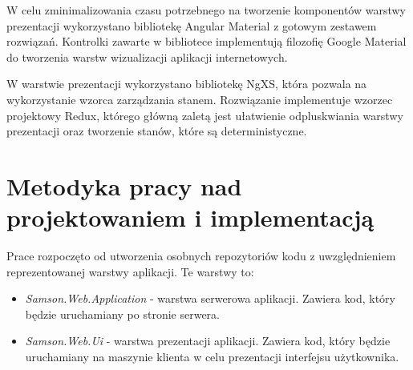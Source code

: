 \documentclass[a4paper,twoside,12pt]{book}
\begin{document}
	W celu zminimalizowania czasu potrzebnego na tworzenie komponentów warstwy prezentacji wykorzystano bibliotekę Angular Material z gotowym zestawem rozwiązań. Kontrolki zawarte w bibliotece implementują filozofię Google Material do tworzenia warstw wizualizacji aplikacji internetowych.
	
	W warstwie prezentacji wykorzystano bibliotekę NgXS, która pozwala na wykorzystanie wzorca zarządzania stanem. Rozwiązanie implementuje wzorzec projektowy Redux, którego główną zaletą jest ułatwienie odpluskwiania warstwy prezentacji oraz tworzenie stanów, które są deterministyczne.
	
	\section {Metodyka pracy nad projektowaniem i implementacją}
	
	Prace rozpoczęto od utworzenia osobnych repozytoriów kodu z uwzględnieniem reprezentowanej warstwy aplikacji. Te warstwy to:
	\begin{itemize}
		\item \textit{Samson.Web.Application} - warstwa serwerowa aplikacji. Zawiera kod, który będzie uruchamiany po stronie serwera.
		\item \textit{Samson.Web.Ui} - warstwa prezentacji aplikacji. Zawiera kod, który będzie uruchamiany na maszynie klienta w celu prezentacji interfejsu użytkownika.
	\end{itemize}
\end{document}
